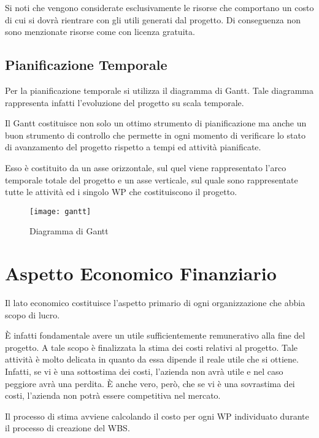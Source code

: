 Si noti che vengono considerate esclusivamente le risorse che comportano un costo di cui si dovrà rientrare con gli utili generati dal progetto. Di conseguenza non sono menzionate risorse come \sw con licenza gratuita.

\subsection{Pianificazione Temporale}
Per la pianificazione temporale si utilizza il diagramma di Gantt. Tale diagramma rappresenta infatti l'evoluzione del progetto su scala temporale.

Il Gantt costituisce non solo un ottimo strumento di pianificazione ma anche un buon strumento di controllo che permette in ogni momento di verificare lo stato di avanzamento del progetto rispetto a tempi ed attività pianificate.

Esso è costituito da un asse orizzontale, sul quel viene rappresentato l'arco temporale totale del progetto e un asse verticale, sul quale sono rappresentate tutte le attività ed i singolo WP che costituiscono il progetto.

\begin{figure}[!h]
  \texttt{[image: gantt]}	
	\caption{Diagramma di Gantt}
	\label{fig:gantt}
\end{figure}

\clearpage

\section{Aspetto Economico Finanziario}\label{sec:aspettoeconomico}
Il lato economico costituisce l'aspetto primario di ogni organizzazione che abbia scopo di lucro.

È infatti fondamentale avere un utile sufficientemente remunerativo alla fine del progetto. A tale scopo è finalizzata la stima dei costi relativi al progetto. Tale attività è molto delicata in quanto da essa dipende il reale utile che si ottiene. Infatti, se vi è una sottostima dei costi, l'azienda non avrà utile e nel caso peggiore avrà una perdita. È anche vero, però, che se vi è una sovrastima dei costi, l'azienda non potrà essere competitiva nel mercato.

Il processo di stima avviene calcolando il costo per ogni WP individuato durante il processo di creazione del WBS.


